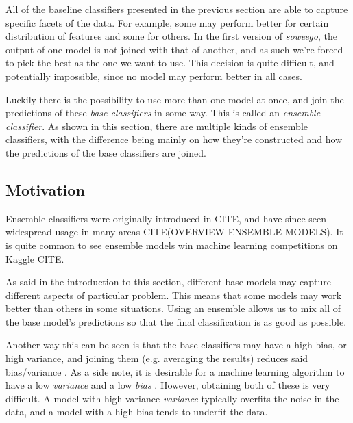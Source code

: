 \documentclass[epsfig,a4paper,11pt,titlepage,twoside,openany]{book}
\begin{document}
All of the baseline classifiers presented in the previous section are able to capture specific facets of the data. For example, some may perform better for certain distribution of features and some for others. In the first version of \textit{soweego}, the output of one model is not joined with that of another, and as such we're forced to pick the best as the one we want to use. This decision is quite difficult, and potentially impossible, since no model may perform better in all cases. 

Luckily there is the possibility to use more than one model at once, and join the predictions of these \textit{base classifiers} in some way. This is called an \textit{ensemble classifier}. As shown in this section, there are multiple kinds of ensemble classifiers, with the difference being mainly on how they're constructed and how the predictions of the base classifiers are joined.




\subsection{Motivation} 
\label{sec:motivation-ensemble}

Ensemble classifiers were originally introduced in CITE, and have since seen widespread usage in many areas CITE(OVERVIEW ENSEMBLE MODELS). It is quite common to see ensemble models win machine learning competitions on Kaggle CITE. 

As said in the introduction to this section, different base models may capture different aspects of particular problem. This means that some models may work better than others in some situations. Using an ensemble allows us to mix all of the base model's predictions so that the final classification is as good as possible. 

Another way this can be seen is that the base classifiers may have a high bias, or high variance, and joining them (e.g. averaging the results) reduces said bias/variance \cite{Breiman1996_bagging_predictors}. As a side note, it is desirable for a machine learning algorithm to have a low \textit{variance} and a low \textit{bias} \cite{Munro2011_bias_variance_decomp}. However, obtaining both of these is very difficult. A model with high variance \textit{variance} typically overfits the noise in the data, and a model with a high bias tends to underfit the data. 
\end{document}
